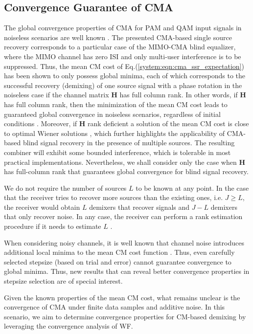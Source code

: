 \subsection{Convergence Guarantee of CMA}
The global convergence properties of CMA for PAM and QAM input signals in noiseless scenarios are well known \cite[Chapters 4, 7]{Ding2000}. 
The presented CMA-based single source recovery corresponds to a particular case of the MIMO-CMA blind equalizer, where the MIMO channel has zero ISI and only multi-user interference is to be suppressed.
Thus, the mean CM cost of Eq.(\ref{system:eqn:cma_ssr_expectation}) has been shown to only possess global minima, each of which corresponds to the successful recovery (demixing) of one source signal with a phase rotation in the noiseless case if the channel matrix $\bm{H}$ has full column rank.
In other words, if $\bm{H}$ has full column rank, then the minimization of the mean CM cost leads to guaranteed global convergence in noiseless scenarios, regardless of initial conditions \cite{Li1998adaptivemimocma}. 
Moreover, if $\bm{H}$ rank deficient a solution of the mean CM cost is close to optimal Wiener solutions \cite{Zheng1999nonfullrank}, which further highlights the applicability of CMA-based blind signal recovery in the presence of multiple sources. The resulting combiner will exhibit some bounded interference, which is tolerable in most practical implementations. Nevertheless, we shall consider only the case when $\bm{H}$ has full-column rank that guarantees global convergence for blind signal recovery.  

We do not require the number of sources $L$ to be known at any point. In the case that the receiver tries to recover more sources than the existing ones, i.e. $J\geq L$, the receiver would obtain $L$ demixers that recover signals and $J-L$ demixers that only recover noise. In any case, the receiver can perform a rank estimation procedure if it needs to estimate $L$ \cite{Akaike1974aic,Wax1985rankestimation}. 

When considering noisy channels, it is well known that channel noise introduces additional local minima to the mean CM cost function \cite{Ding2000}. 
Thus, even carefully selected stepsize (based on trial and error) cannot guarantee convergence to global minima. 
Thus, new results that can reveal better convergence properties in stepsize selection are of special interest.

Given the known properties of the mean CM cost, what remains unclear is the convergence of CMA under finite data samples and additive noise. In this scenario, we aim to determine convergence properties for CM-based demixing by leveraging the convergence analysis of WF. 


